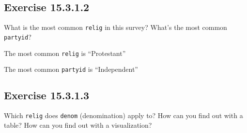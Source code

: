 \documentclass[]{book}
\newenvironment{Shaded}{\begin{snugshade}}{\end{snugshade}}
\newcommand{\CommentTok}[1]{\textcolor[rgb]{0.56,0.35,0.01}{\textit{#1}}}
\newcommand{\DecValTok}[1]{\textcolor[rgb]{0.00,0.00,0.81}{#1}}
\newcommand{\KeywordTok}[1]{\textcolor[rgb]{0.13,0.29,0.53}{\textbf{#1}}}
\newcommand{\NormalTok}[1]{#1}
\newcommand{\OperatorTok}[1]{\textcolor[rgb]{0.81,0.36,0.00}{\textbf{#1}}}
\newcommand{\StringTok}[1]{\textcolor[rgb]{0.31,0.60,0.02}{#1}}
\theoremstyle{plain}
\theoremstyle{remark}
\begin{document}
\hypertarget{exercise-15.3.1.2}{%
\subsection*{\texorpdfstring{Exercise
{15.3.1.2}}{Exercise 15.3.1.2}}\label{exercise-15.3.1.2}}

What is the most common \texttt{relig} in this survey? What's the most
common \texttt{partyid}?

The most common \texttt{relig} is ``Protestant''

\begin{Shaded}
\end{Shaded}

The most common \texttt{partyid} is ``Independent''

\begin{Shaded}
\end{Shaded}

\hypertarget{exercise-15.3.1.3}{%
\subsection*{\texorpdfstring{Exercise
{15.3.1.3}}{Exercise 15.3.1.3}}\label{exercise-15.3.1.3}}

Which \texttt{relig} does \texttt{denom} (denomination) apply to? How
can you find out with a table? How can you find out with a
visualization?
\end{document}
